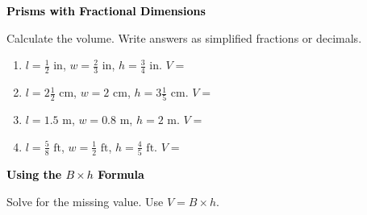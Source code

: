 \documentclass[12pt, letterpaper, fleqn]{article}
\newcommand{\blank}{\underline{\hspace{2.2cm}}}
\begin{document}
\newpage

\begin{tcolorbox}[colback=black!10]
\large\textcolor{black}{\textbf{Prisms with Fractional Dimensions}}
\end{tcolorbox}

\noindent
Calculate the volume. Write answers as simplified fractions or decimals.

\vspace{3mm}

\begin{enumerate}[itemsep=2.2cm, leftmargin=0.6cm]

\item $l = \frac{1}{2}\text{ in}$, $w = \frac{2}{3}\text{ in}$, $h = \frac{3}{4}\text{ in}$. \quad $V =$ \blank

\vspace{1.5cm}

\item $l = 2\frac{1}{2}\text{ cm}$, $w = 2\text{ cm}$, $h = 3\frac{1}{5}\text{ cm}$. \quad $V =$ \blank

\vspace{1.5cm}

\item $l = 1.5\text{ m}$, $w = 0.8\text{ m}$, $h = 2\text{ m}$. \quad $V =$ \blank

\vspace{1.5cm}

\item $l = \frac{5}{8}\text{ ft}$, $w = \frac{1}{2}\text{ ft}$, $h = \frac{4}{5}\text{ ft}$. \quad $V =$ \blank

\vspace{1.5cm}

\end{enumerate}

\newpage

\begin{tcolorbox}[colback=black!10]
\large\textcolor{black}{\textbf{Using the $B \times h$ Formula}}
\end{tcolorbox}

\noindent
Solve for the missing value. Use $V = B \times h$.

\vspace{3mm}
\end{document}
